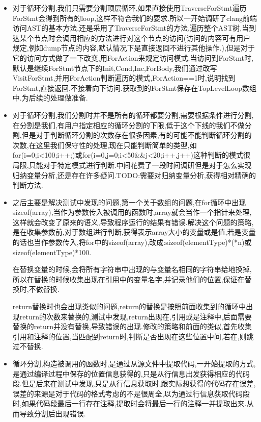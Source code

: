 \begin{itemize}
\item{对于循环分割,我们只需要分割顶层循环,如果直接使用TraverseForStmt遍历ForStmt会得到所有的loop,这样不符合我们的要求.所以一开始调研了clang前端访问AST的基本方法,还是采用了TraverseForStmt的方法,遍历整个AST树,当到达某个节点时会调用相应的方法进行对这个节点的访问(访问的内容可有用户规定,例如dump节点的内容,默认情况下是直接返回不进行其他操作.),但是对于它的访问方式做了一下改变,用ForAction来规定访问模式.当访问到ForStmt时,默认是继续ForStmt节点下的Init,Cond,Inc,ForBody,我们通过改写VisitForStmt,并用ForAction判断遍历的模式,ForAction==1时,说明找到ForStmt,直接返回,不接着向下访问.获取到的ForStmt保存在TopLevelLoop数组中.为后续的处理做准备.}

\item{对于循环分割,我们分割时并不是所有的循环都要分割,需要根据条件进行分割,在分割是我们,有用户指定相应的循环分割的下限,低于这个下线的我们不做分割,但是对于判断循环分割的次数存在很多因素,有的可能不能判断循环分割的次数,在这里我们保守性的处理,现在只能判断简单的类型,如for(i=0;i<100;i++;)或for(i=0,j=0;i<50\&\&j<20;i++,j++)这种判断的模式很局限,只能对于特定模式进行判断.中间花费了一段时间调研但是对于怎么实现归纳变量分析,还是存在许多疑问.TODO:需要对归纳变量分析,获得相对精确的判断方法.}

\item{之后主要是解决测试中发现的问题,第一个关于数组的问题,在for循环中出现sizeof(array),当作为参数传入被调用的函数时,array就会当作一个指针来处理,这样就会改变了原来的语义,导致程序运行的结果有错误.解决这个问题的策略,是在收集参数前,对于数组进行判断,获得表示array大小的变量或是值,若是变量的话也当作参数传入,将for中的sizeof(array),改成:sizeof(elementType)*(*n)或sizeof(elementType)*100.
     
     在替换变量的时候,会将所有字符串中出现的与变量名相同的字符串给地换掉,所以在替换的时候收集出现在引用中的变量名字,并记录他们的位置,保证在替换时,不做替换.

     return替换时也会出现类似的问题,return的替换是按照前面收集到的循环中出现return的次数来替换的,测试中发现,return出现在,引用或是注释中,后面需要替换的return并没有替换,导致错误的出现.修改的策略和前面的类似,首先收集引用和注释的位置,当匹配到return时,判断是否出现在这些位置中间,若在,则跳过不替换.
     }


\item{循环分割,构造被调用的函数时,是通过从源文件中提取代码,一开始提取的方式,是通过编译过程中保存的位置信息获得的,只是从行信息出发获得相应的代码段.但是后来在测试中发现,只是从行信息获取时,跟实际想获得的代码存在误差,误差的来源是对于代码的格式考虑的不是很周全,以为通过行信息获取代码段时,如果代码段最后一行存在注释,提取时会将最后一行的注释一并提取出来.从而导致分割后出现错误.
     
}
\end{itemize}
